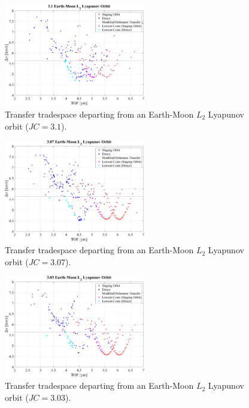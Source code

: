 \begin{figure}[ht]
    \centering
    \includegraphics[width=0.55\textwidth]{figures/TradeSpace_L2Lyapunov_3_10.pdf}
    \caption{Transfer tradespace departing from an Earth-Moon $L_{2}$ Lyapunov orbit ($JC=3.1$).}
\end{figure}

\begin{figure}[ht]
    \centering
    \includegraphics[width=0.55\textwidth]{figures/TradeSpace_L2Lyapunov_3_07.pdf}
    \caption{Transfer tradespace departing from an Earth-Moon $L_{2}$ Lyapunov orbit ($JC=3.07$).}
\end{figure}

\begin{figure}[ht]
    \centering
    \includegraphics[width=0.55\textwidth]{figures/TradeSpace_L2Lyapunov_3_03.pdf}
    \caption{Transfer tradespace departing from an Earth-Moon $L_{2}$ Lyapunov orbit ($JC=3.03$).}
\end{figure}

